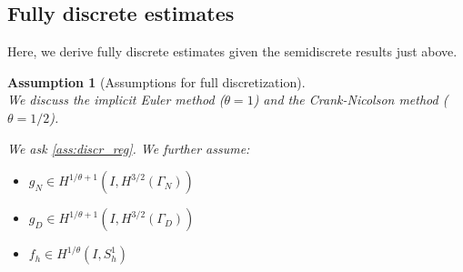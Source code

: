 \documentclass[english,a4paper,10pt,oneside]{scrbook}	%
\theoremstyle{break}
\newtheorem{ass}[equation]{Assumption}
\theoremstyle{remark}
\newcommand{\norm}[1]{\left\lVert#1\right\rVert}
\begin{document}
\begin{appendices}
%
%
%
%
%
%

\section{Fully discrete estimates}
\label{sec:fullyd}
Here, we derive fully discrete estimates given the semidiscrete results just above.

\begin{ass}[Assumptions for full discretization]
\label{ass:full_discr_smoothness}
\mbox{}\\
We discuss the implicit Euler method ($\theta=1$) and the Crank-Nicolson method ($\theta=1/2$).

We ask \cref{ass:discr_reg}.
We further assume:

\begin{itemize}
	\item $g_N \in H^{1/\theta+1}(I, H^{3/2}(\Gamma_N))$	%
	\item $g_D \in H^{1/\theta+1}(I, H^{3/2}(\Gamma_D))$
	\item $f_h\in H^{1/\theta}(I, S^1_{h})$
\end{itemize}


\end{ass}
\end{appendices}
\end{document}
